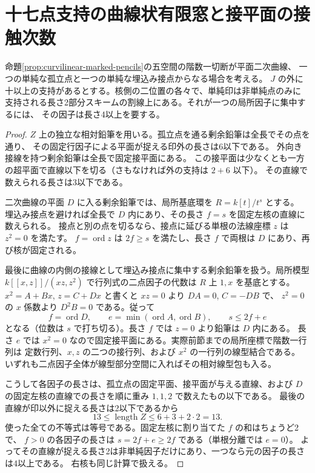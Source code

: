\section{十七点支持の曲線状有限窓と接平面の接触次数}
\label{sec:finite-seventeen-site-pencils}
\begin{lemma}\label{lem:embedded-conic-contact-budget}
命題\ref{prop:curvilinear-marked-pencils}の五空間の階数一切断が平面二次曲線、
一つの単純な孤立点と一つの単純な埋込み接点からなる場合を考える。
$J$ の外に十以上の支持があるとする。核側の二位置の各々で、単純印は非単純点のみに
支持される長さ2部分スキームの割線上にある。それが一つの局所因子に集中するには、
その因子は長さ4以上を要する。
\end{lemma}
\begin{proof}
$Z$ 上の独立な相対鉛筆を用いる。孤立点を通る剰余鉛筆は全長でその点を通り、
その固定行因子による平面が捉える印外の長さは6以下である。
外向き接線を持つ剰余鉛筆は全長で固定接平面にある。
この接平面は少なくとも一方の超平面で直線以下を切る（さもなければ外の支持は $2+6$ 以下）。
その直線で数えられる長さは3以下である。

二次曲線の平面 $D$ に入る剰余鉛筆では、局所基底環を $R=k[t]/t^s$ とする。
埋込み接点を避ければ全長で $D$ 内にあり、その長さ $f=s$ を固定左核の直線に数えられる。
接点と別の点を切るなら、接点に延びる単根の法線座標 $z$ は $z^2=0$ を満たす。
$f=\operatorname{ord}z$ は $2f\ge s$ を満たし、長さ $f$ で両根は $D$ にあり、再び核が固定される。

最後に曲線の内側の接線として埋込み接点に集中する剰余鉛筆を扱う。局所模型
$k[[x,z]]/(xz,z^2)$ で行列式の二点因子の代数は $R$ 上 $1,x$ を基底とする。
$x^2=A+Bx$, $z=C+Dx$ と書くと $xz=0$ より $DA=0$, $C=-DB$ で、
$z^2=0$ の $x$ 係数より $D^2B=0$ である。従って
\[
    f=\operatorname{ord}D,\qquad e=\min(\operatorname{ord}A,\operatorname{ord}B),
    \qquad s\le 2f+e
\]
となる（位数は $s$ で打ち切る）。長さ $f$ では $z=0$ より鉛筆は $D$ 内にある。
長さ $e$ では $x^2=0$ なので固定接平面にある。実際前節までの局所座標で階数一行列は
定数行列、$x,z$ の二つの接行列、および $x^2$ の一行列の線型結合である。
いずれも二点因子全体が線型部分空間に入ればその相対線型包も入る。

こうして各因子の長さは、孤立点の固定平面、接平面が与える直線、および
$D$ の固定左核の直線での長さを順に重み $1,1,2$ で数えたもの以下である。
最後の直線が印以外に捉える長さは2以下であるから
\[
              13\le \operatorname{length} Z\le 6+3+2\cdot 2=13 .
\]
使った全ての不等式は等号である。固定左核に割り当てた $f$ の和はちょうど2で、
$f>0$ の各因子の長さは $s=2f+e\ge2f$ である（単根分離では $e=0$）。
よってその直線が捉える長さ2は非単純因子だけにあり、一つなら元の因子の長さは4以上である。
右核も同じ計算で扱える。
\end{proof}

